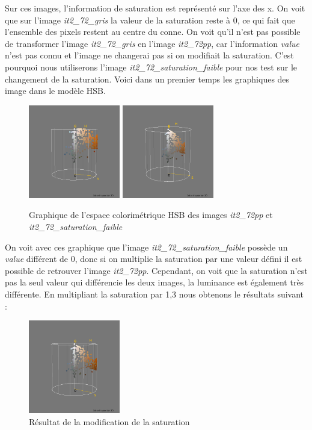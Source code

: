\documentclass[a4paper,10pt]{article}
\begin{document}
Sur ces images, l'information de saturation est représenté sur l'axe des x. On voit que sur l'image \textit{it2\_72\_gris} la
valeur de la saturation reste à 0, ce qui fait que l'ensemble des pixels restent au centre du conne. On voit qu'il n'est pas
possible de transformer l'image \textit{it2\_72\_gris} en l'image \textit{it2\_72pp}, car l'information \textit{value} n'est pas
connu et l'image ne changerai pas si on modifiait la saturation. C'est pourquoi nous utiliserons l'image \textit{it2\_72\_saturation\_faible}
pour nos test sur le changement de la saturation. Voici dans un premier temps les graphiques des image dans le modèle HSB.

\begin{figure}[!h]
 \begin{center}
 \includegraphics[width=4cm]{resultat/saturation1_2.png}
 \includegraphics[width=4cm]{resultat/saturation2_2.png}
 \caption{Graphique de l'espace colorimétrique HSB des images \textit{it2\_72pp} et \textit{it2\_72\_saturation\_faible}}
 \end{center}
\end{figure}
\newpage

On voit avec ces graphique que l'image \textit{it2\_72\_saturation\_faible} possède un \textit{value} différent de 0, donc si on 
multiplie la saturation par une valeur défini il est possible de retrouver l'image \textit{it2\_72pp}. Cependant, on voit que 
la saturation n'est pas la seul valeur qui différencie les deux images, la luminance est également très différente. En multipliant
la saturation par 1,3 nous obtenons le résultats suivant :

\begin{figure}[!h]
 \begin{center}
 \includegraphics[width=4cm]{resultat/resultat_saturation.png}
 \caption{Résultat de la modification de la saturation}
 \end{center}
\end{figure}
\end{document}
